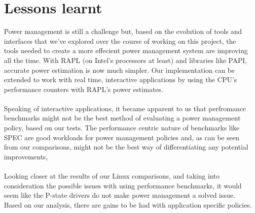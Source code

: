 \section{Lessons learnt}\label{sec:disc}

Power management is still a challenge but, based on the evolution of tools and interfaces that we've explored 
over the course of working on this project, the tools needed to create a more effecient power management system 
are improving all the time. With RAPL (on Intel's processors at least) and libraries like PAPI, accurate power 
estimation is now much simpler. Our implementation can be extended to work with real time, interactive applications 
by using the CPU's performance counters with RAPL's power estimates.

\paragraph{}Speaking of interactive applications, it became apparent to us that perfromance benchmarks might not be the best method  
of evaluating a power management policy, based on our tests. The performance centric nature of benchmarks like SPEC 
are good workloads for power management policies and, as can be seen from our comparisons, might not be the best way 
of differentiating any potential improvements,

\paragraph{} Looking closer at the results of our Linux comparisons, and taking into consideration the possible issues 
with using performance benchmarks, it would seem like the P-state drivers do not make power management a solved issue. 
Based on our analysis, there are gains to be had with application specific policies.
